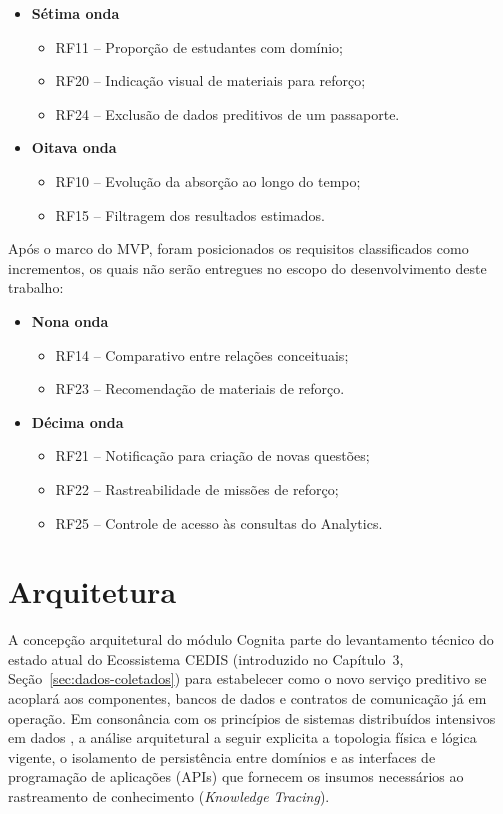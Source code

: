 \begin{itemize}
\begin{itemize}
    \end{itemize}
    \item \textbf{Sétima onda}
    \begin{itemize}
        \item RF11 -- Proporção de estudantes com domínio;
        \item RF20 -- Indicação visual de materiais para reforço;
        \item RF24 -- Exclusão de dados preditivos de um passaporte.
    \end{itemize}
    \item \textbf{Oitava onda}
    \begin{itemize}
        \item RF10 -- Evolução da absorção ao longo do tempo;
        \item RF15 -- Filtragem dos resultados estimados.
    \end{itemize}
\end{itemize}

Após o marco do MVP, foram posicionados os requisitos classificados como incrementos, os quais não serão entregues no escopo do desenvolvimento deste trabalho:

\begin{itemize}
    \item \textbf{Nona onda}
    \begin{itemize}
        \item RF14 -- Comparativo entre relações conceituais;
        \item RF23 -- Recomendação de materiais de reforço.
    \end{itemize}
    \item \textbf{Décima onda}
    \begin{itemize}
        \item RF21 -- Notificação para criação de novas questões;
        \item RF22 -- Rastreabilidade de missões de reforço;
        \item RF25 -- Controle de acesso às consultas do Analytics.
    \end{itemize}
\end{itemize}

\section{Arquitetura}
\label{sec:arquitetura}

A concepção arquitetural do módulo Cognita parte do levantamento técnico do estado atual do Ecossistema CEDIS (introduzido no Capítulo~3, Seção~\ref{sec:dados-coletados}) para estabelecer como o novo serviço preditivo se acoplará aos componentes, bancos de dados e contratos de comunicação já em operação. Em consonância com os princípios de sistemas distribuídos intensivos em dados \cite{kleppmann_designing_2017, richards_fundamentals_2020}, a análise arquitetural a seguir explicita a topologia física e lógica vigente, o isolamento de persistência entre domínios e as interfaces de programação de aplicações (APIs) que fornecem os insumos necessários ao rastreamento de conhecimento (\textit{Knowledge Tracing}).

